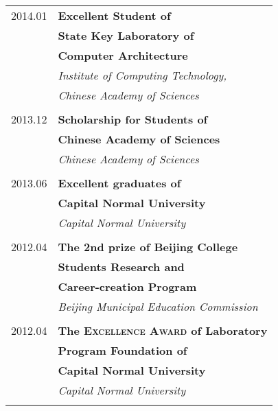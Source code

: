 \documentclass[10pt,a4paper]{article} %
\begin{document}
\begin{minipage}[t]{0.44\textwidth}
\begin{tabular}{rl}
2014.01     &\small\textbf{Excellent Student of}\\
& \small\textbf{ State Key Laboratory of}\\
& \small\textbf{ \quad Computer Architecture}\\
& \small\textit{Institute of Computing Technology,}\\
& \small\textit{ Chinese Academy of Sciences}\\\\
2013.12     &\small\textbf{Scholarship for Students of}\\
& \small\textbf{ Chinese Academy of Sciences}\\
& \small\textit{Chinese Academy of Sciences}\\ \\

2013.06     &\small\textbf{Excellent graduates of}\\
& \small\textbf{ Capital Normal University}\\
& \small\textit{Capital Normal University}\\ \\
2012.04     & \small\textbf{The 2nd prize of Beijing College }\\
& \small\textbf{ Students Research and }\\
& \small\textbf{ Career-creation Program}\\
& \small\textit{Beijing Municipal Education Commission}\\ \\

2012.04     & \small\textbf{The \textsc{Excellence Award} of Laboratory }\\
& \small\textbf{ Program Foundation of  }\\
& \small\textbf{ Capital Normal University}\\
& \small\textit{Capital Normal University}\\ \\


\end{tabular}
\end{minipage}
\end{document}
